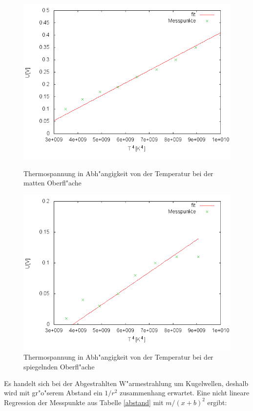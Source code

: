 	\begin{figure}[htbp]
		\centering
		\includegraphics[width = 12cm]{img/matt.png}
		\caption{Thermospannung in Abh"angigkeit von der Temperatur bei der matten Oberfl"ache}
		\label{matt_graph}

		\centering
		\includegraphics[width = 12cm]{img/spiegel.png}
		\caption{Thermospannung in Abh"angigkeit von der Temperatur bei der spiegelnden Oberfl"ache}
		\label{spiegel_graph}
	\end{figure}

	
	
	
	

	Es handelt sich bei der Abgestrahlten W"armestrahlung um Kugelwellen, deshalb wird mit gr"o"serem Abstand ein $1/r^2$ zusammenhang erwartet.
	Eine nicht lineare Regression der Messpunkte aus Tabelle \eqref{abstand} mit $m/(x+b)^2$ ergibt:

